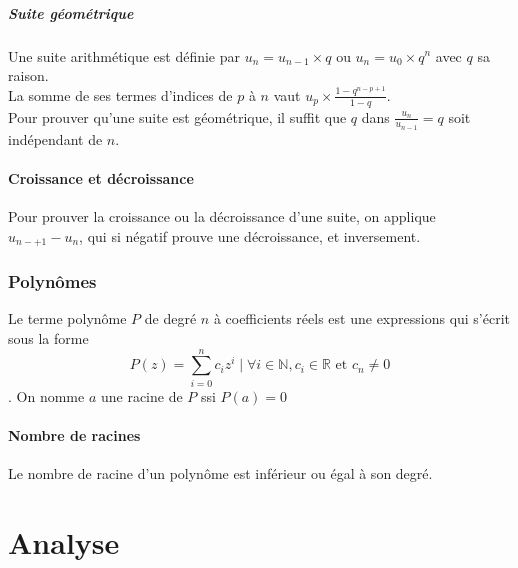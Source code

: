 \documentclass{article}
\begin{document}
\subsubsection{Suite géométrique}
Une suite arithmétique est définie par $u_n = u_{n-1} \times q$ ou $u_n = u_0 \times q^n$ avec $q$ sa raison.\\
La somme de ses termes d'indices de $p$ à $n$ vaut $u_p\times \frac{1-q^{n-p+1}}{1-q}$.\\
Pour prouver qu'une suite est géométrique, il suffit que $q$ dans $\frac{u_n}{u_{n-1}} = q$ soit indépendant de $n$.


\subsection{Croissance et décroissance}
Pour prouver la croissance ou la décroissance d'une suite, on applique \\$u_{n-+1} - u_n$, qui si négatif prouve une décroissance, et inversement.



\section{Polynômes}
Le terme polynôme $P$ de degré $n$ à coefficients réels est une expressions qui s'écrit sous la forme $$P(z) = \sum^n_{i=0}c_iz^i \mid \forall i \in \mathbb{N}, c_i\in \mathbb{R} \text{ et } c_n \neq 0 $$.
On nomme $a$ une racine de $P$ ssi $P(a) = 0$
\subsection{Nombre de racines}
Le nombre de racine d'un polynôme est inférieur ou égal à son degré.\\

\pagebreak\part{Analyse}
\setcounter{section}{0}
\renewcommand*{\theHsection}{chX.\the\value{section}}
\end{document}

